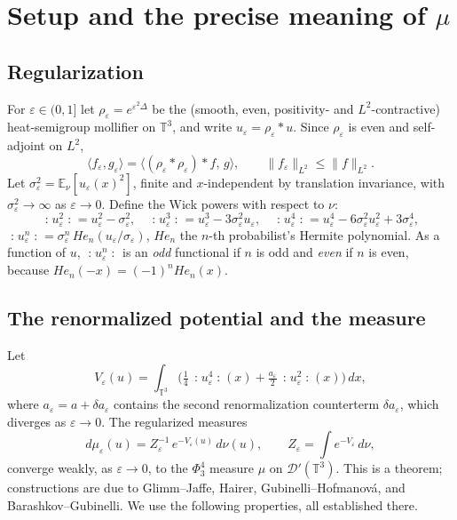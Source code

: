 \documentclass[12pt]{article}
\newcommand{\bT}{\mathbb{T}}
\newcommand{\bE}{\mathbb{E}}
\newcommand{\cD}{\mathcal{D}}
\newcommand{\eps}{\varepsilon}
\newcommand{\Wick}[1]{\mathopen{:}#1\mathclose{:}}
\theoremstyle{plain}
\theoremstyle{definition}
\begin{document}
\section{Setup and the precise meaning of $\mu$}\label{sec:setup}

\subsection{Regularization}
For $\eps\in(0,1]$ let $\rho_\eps=e^{\eps^2\Delta}$ be the (smooth, even, positivity-
and $L^2$-contractive) heat-semigroup mollifier on $\bT^3$, and write
$u_\eps=\rho_\eps*u$. Since $\rho_\eps$ is even and self-adjoint on $L^2$,
\begin{equation}\label{eq:moll-selfadj}
\langle f_\eps,g_\eps\rangle=\langle (\rho_\eps*\rho_\eps)*f,\,g\rangle,
\qquad \|f_\eps\|_{L^2}\le\|f\|_{L^2}.
\end{equation}
Let $\sigma_\eps^2=\bE_\nu[u_\eps(x)^2]$, finite and $x$-independent by translation
invariance, with $\sigma_\eps^2\to\infty$ as $\eps\to0$. Define the Wick powers with
respect to $\nu$:
\begin{equation}\label{eq:wick}
\Wick{u_\eps^2}=u_\eps^2-\sigma_\eps^2,\quad
\Wick{u_\eps^3}=u_\eps^3-3\sigma_\eps^2 u_\eps,\quad
\Wick{u_\eps^4}=u_\eps^4-6\sigma_\eps^2 u_\eps^2+3\sigma_\eps^4 ,
\end{equation}
$\Wick{u_\eps^n}=\sigma_\eps^{n}\,He_n(u_\eps/\sigma_\eps)$, $He_n$ the $n$-th
probabilist's Hermite polynomial. As a function of $u$, $\Wick{u_\eps^n}$ is an
\emph{odd} functional if $n$ is odd and \emph{even} if $n$ is even, because
$He_n(-x)=(-1)^nHe_n(x)$.

\subsection{The renormalized potential and the measure}
Let
\begin{equation}\label{eq:Veps}
V_\eps(u)=\int_{\bT^3}\Big(\tfrac14\,\Wick{u_\eps^4}(x)
+\tfrac{a_\eps}{2}\,\Wick{u_\eps^2}(x)\Big)\,dx ,
\end{equation}
where $a_\eps=a+\delta a_\eps$ contains the second renormalization counterterm
$\delta a_\eps$, which diverges as $\eps\to0$. The regularized measures
\begin{equation}\label{eq:mueps}
d\mu_\eps(u)=Z_\eps^{-1}\,e^{-V_\eps(u)}\,d\nu(u),\qquad
Z_\eps=\int e^{-V_\eps}\,d\nu,
\end{equation}
converge weakly, as $\eps\to0$, to the $\Phi^4_3$ measure $\mu$ on $\cD'(\bT^3)$.
This is a theorem; constructions are due to Glimm--Jaffe, Hairer,
Gubinelli--Hofmanov\'a, and Barashkov--Gubinelli. We use the following properties,
all established there.
\end{document}
